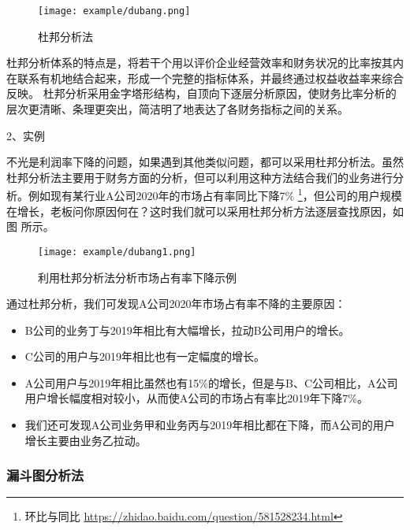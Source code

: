 \begin{figure}[!htp]

\centering
\texttt{[image: example/dubang.png]}
\caption{杜邦分析法}
\label{figure:1-7}

\end{figure}

杜邦分析体系的特点是，将若干个用以评价企业经营效率和财务状况的比率按其内在联系有机地结合起来，形成一个完整的指标体系，并最终通过权益收益率来综合反映。
杜邦分析采用金字塔形结构，自顶向下逐层分析原因，使财务比率分析的层次更清晰、条理更突出，简洁明了地表达了各财务指标之间的关系。

2、实例

不光是利润率下降的问题，如果遇到其他类似问题，都可以采用杜邦分析法。虽然杜邦分析法主要用于财务方面的分析，但可以利用这种方法结合我们的业务进行分析。例如现有某行业A公司2020年的市场占有率同比下降7$\%$ \footnote{环比与同比 \quad \url{https://zhidao.baidu.com/question/581528234.html}}，但公司的用户规模在增长，老板问你原因何在？这时我们就可以采用杜邦分析方法逐层查找原因，如图\href{}{} 所示。

\begin{figure}[!htp]

\centering
\texttt{[image: example/dubang1.png]}
\caption{利用杜邦分析法分析市场占有率下降示例}
\label{figure:1-7}

\end{figure}

通过杜邦分析，我们可发现A公司2020年市场占有率不降的主要原因：
\begin{itemize}
    \item B公司的业务丁与2019年相比有大幅增长，拉动B公司用户的增长。
    \item C公司的用户与2019年相比也有一定幅度的增长。
    \item A公司用户与2019年相比虽然也有15$\%$的增长，但是与B、C公司相比，A公司用户增长幅度相对较小，从而使A公司的市场占有率比2019年下降7$\%$。
    \item 我们还可发现A公司业务甲和业务丙与2019年相比都在下降，而A公司的用户增长主要由业务乙拉动。
\end{itemize}

\subsubsection{漏斗图分析法}

